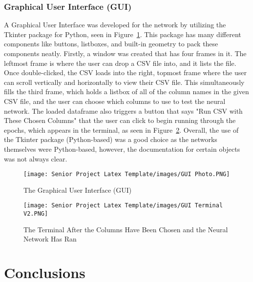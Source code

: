 \documentclass[12pt,letterpaper,oneside,reqno]{book}
\theoremstyle{plain}
\theoremstyle{definition}
\theoremstyle{plain}
\theoremstyle{remark}
\theoremstyle{plain}
\theoremstyle{definition}
\theoremstyle{plain}
\begin{document}
\subsection{Graphical User Interface (GUI)}
A Graphical User Interface  was developed for the network by utilizing the Tkinter package for Python, seen in Figure~\ref{fig:GUIPho}. This package has many different components like buttons, listboxes, and built-in geometry to pack these components neatly. Firstly, a window was created that has four frames in it. The leftmost frame is where the user can drop a CSV file into, and it lists the file. Once double-clicked, the CSV loads into the right, topmost frame where the user can scroll vertically and horizontally to view their CSV file. This simultaneously fills the third frame, which holds a listbox of all of the column names in the given CSV file, and the user can choose which columns to use to test the neural network. The loaded dataframe also triggers a button that says "Run CSV with These Chosen Columns" that the user can click to begin running through the epochs, which appears in the terminal, as seen in Figure~\ref{fig:GUITer}. Overall, the use of the Tkinter package (Python-based) was a good choice as the networks themselves were Python-based, however, the documentation for certain objects was not always clear.
\begin{figure}[H]
    \centering
    \texttt{[image: Senior Project Latex Template/images/GUI Photo.PNG]}
    \caption{The Graphical User Interface (GUI)}
    \label{fig:GUIPho}
\end{figure}
\begin{figure}[H]
    \centering
    \texttt{[image: Senior Project Latex Template/images/GUI Terminal V2.PNG]}
    \caption{The Terminal After the Columns Have Been Chosen and the Neural Network Has Ran}
    \label{fig:GUITer}
\end{figure}


\chapter{Conclusions}
\end{document}
